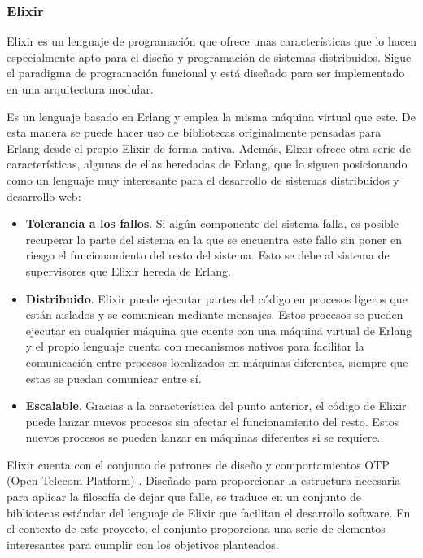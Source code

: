 \subsubsection{Elixir}

Elixir \cite{elixir} es un lenguaje de programación que ofrece unas características que lo hacen especialmente apto para el diseño y programación de sistemas distribuidos. Sigue el paradigma de programación funcional y está diseñado para ser implementado en una arquitectura modular.

Es un lenguaje basado en Erlang \cite{erlang} y emplea la misma máquina virtual que este. De esta manera se puede hacer uso de bibliotecas originalmente pensadas para Erlang desde el propio Elixir de forma nativa. Además, Elixir ofrece otra serie de características, algunas de ellas heredadas de Erlang, que lo siguen posicionando como un lenguaje muy interesante para el desarrollo de sistemas distribuidos y desarrollo web:

\begin{itemize}
	\item \textbf{Tolerancia a los fallos}. Si algún componente del sistema falla, es posible recuperar la parte del sistema en la que se encuentra este fallo sin poner en riesgo el funcionamiento del resto del sistema. Esto se debe al sistema de supervisores que Elixir hereda de Erlang.
	\item \textbf{Distribuido}. Elixir puede ejecutar partes del código en procesos ligeros que están aislados y se comunican mediante mensajes. Estos procesos se pueden ejecutar en cualquier máquina que cuente con una máquina virtual de Erlang y el propio lenguaje cuenta con mecanismos nativos para facilitar la comunicación entre procesos localizados en máquinas diferentes, siempre que estas se puedan comunicar entre sí.
	\item \textbf{Escalable}. Gracias a la característica del punto anterior, el código de Elixir puede lanzar nuevos procesos sin afectar el funcionamiento del resto. Estos nuevos procesos se pueden lanzar en máquinas diferentes si se requiere.
\end{itemize}

Elixir cuenta con el conjunto de patrones de diseño y comportamientos OTP (Open Telecom Platform) \cite{erlangotp}. Diseñado para proporcionar la estructura necesaria para aplicar la filosofía de dejar que falle, se traduce en un conjunto de bibliotecas estándar del lenguaje de Elixir que facilitan el desarrollo software. En el contexto de este proyecto, el conjunto proporciona una serie de elementos interesantes para cumplir con los objetivos planteados.

